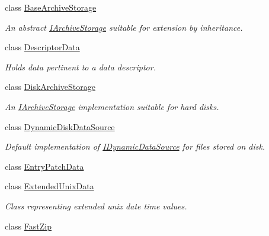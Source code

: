 \begin{DoxyCompactItemize}
\item 
class \hyperlink{class_i_c_sharp_code_1_1_sharp_zip_lib_1_1_zip_1_1_base_archive_storage}{Base\+Archive\+Storage}
\begin{DoxyCompactList}\small\item\em An abstract \hyperlink{interface_i_c_sharp_code_1_1_sharp_zip_lib_1_1_zip_1_1_i_archive_storage}{I\+Archive\+Storage} suitable for extension by inheritance. \end{DoxyCompactList}\item 
class \hyperlink{class_i_c_sharp_code_1_1_sharp_zip_lib_1_1_zip_1_1_descriptor_data}{Descriptor\+Data}
\begin{DoxyCompactList}\small\item\em Holds data pertinent to a data descriptor. \end{DoxyCompactList}\item 
class \hyperlink{class_i_c_sharp_code_1_1_sharp_zip_lib_1_1_zip_1_1_disk_archive_storage}{Disk\+Archive\+Storage}
\begin{DoxyCompactList}\small\item\em An \hyperlink{interface_i_c_sharp_code_1_1_sharp_zip_lib_1_1_zip_1_1_i_archive_storage}{I\+Archive\+Storage} implementation suitable for hard disks. \end{DoxyCompactList}\item 
class \hyperlink{class_i_c_sharp_code_1_1_sharp_zip_lib_1_1_zip_1_1_dynamic_disk_data_source}{Dynamic\+Disk\+Data\+Source}
\begin{DoxyCompactList}\small\item\em Default implementation of \hyperlink{interface_i_c_sharp_code_1_1_sharp_zip_lib_1_1_zip_1_1_i_dynamic_data_source}{I\+Dynamic\+Data\+Source} for files stored on disk. \end{DoxyCompactList}\item 
class \hyperlink{class_i_c_sharp_code_1_1_sharp_zip_lib_1_1_zip_1_1_entry_patch_data}{Entry\+Patch\+Data}
\item 
class \hyperlink{class_i_c_sharp_code_1_1_sharp_zip_lib_1_1_zip_1_1_extended_unix_data}{Extended\+Unix\+Data}
\begin{DoxyCompactList}\small\item\em Class representing extended unix date time values. \end{DoxyCompactList}\item 
class \hyperlink{class_i_c_sharp_code_1_1_sharp_zip_lib_1_1_zip_1_1_fast_zip}{Fast\+Zip}

\end{DoxyCompactItemize}
